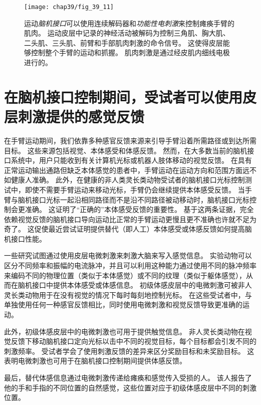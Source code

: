 \begin{figure}[htbp]
	\centering
	\texttt{[image: chap39/fig\_39\_11]}
	\caption{运动\textit{脑机接口}可以使用连续解码器和\textit{功能性电刺激}来控制瘫痪手臂的肌肉。
		运动皮层中记录的神经活动被解码为控制三角肌、胸大肌、二头肌、三头肌、前臂和手部肌肉刺激的命令信号。
		这使得皮层能够控制整个手臂的运动和抓握。
		肌肉刺激是通过经皮肌内细线电极进行的\cite{ajiboye2017restoration}。}
	\label{fig:39_11}
\end{figure}



\section{在脑机接口控制期间，受试者可以使用皮层刺激提供的感觉反馈}

在手臂运动期间，我们依靠多种感官反馈来源来引导手臂沿着所需路径或到达所需目标。
这些来源包括视觉、本体感受和体感反馈。
然而，在大多数当前的脑机接口系统中，用户只能收到有关计算机光标或机器人肢体移动的视觉反馈。
在具有正常运动输出通路但缺乏本体感觉的患者中，手臂运动在运动方向和范围方面远不如健康人准确。
此外，在健康的非人类灵长类动物受试者的脑机接口光标控制测试中，即使不需要手臂运动来移动光标，手臂仍会继续提供本体感受反馈。
当手臂与脑机接口光标一起沿相同路径而不是沿不同路径被动移动时，脑机接口光标控制会更准确。
这证明了“正确的”本体感受反馈的重要性。
基于这两条证据，完全依赖视觉反馈的脑机接口导向运动比正常的手臂运动更慢且更不准确也许就不足为奇了。
这促使最近尝试证明提供替代（即人工）本体感受或体感反馈如何提高脑机接口性能。


一些研究试图通过使用皮层电微刺激来刺激大脑来写入感觉信息。
实验动物可以区分不同频率和振幅的电流脉冲，并且可以利用这种能力通过使用不同的脉冲频率来编码不同的物理位置（类似于本体感觉）或不同的纹理（类似于躯体感觉），从而在脑机接口中提供本体感受或体感信息。
初级体感皮层中的电微刺激可被非人灵长类动物用于在没有视觉的情况下每时每刻地控制光标。
在这些受试者中，与单独使用任何一种感官反馈相比，同时使用电微刺激和视觉反馈导致更准确的运动。


此外，初级体感皮层中的电微刺激也可用于提供触觉信息。
非人灵长类动物在视觉反馈下移动脑机接口定向光标以击中不同的视觉目标，每个目标都会引发不同的刺激频率。 
受试者学会了使用刺激反馈的差异来区分奖励目标和未奖励目标。
这表明电微刺激也可用于在脑机接口控制期间提供体感反馈。


最后，替代体感信息通过电微刺激传递给瘫痪和感觉传入受损的人。
该人报告了他的手和手指的不同位置的自然感觉，这些位置对应于初级体感皮层中不同的刺激位置。




